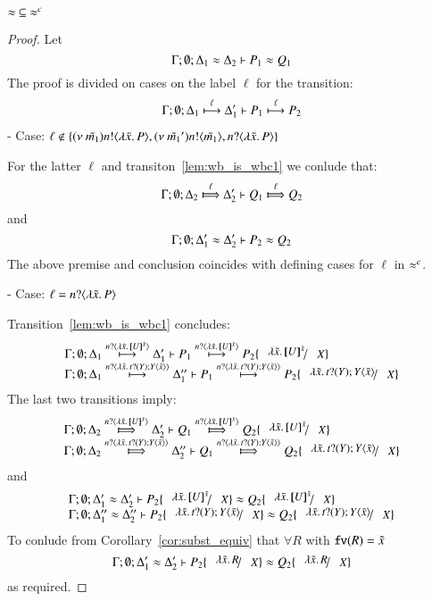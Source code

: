 
\begin{lemma}\rm
	\label{lem:wb_is_wbc}
	$\wb\ \subseteq\ \wbc$
\end{lemma}

\begin{proof}
	Let
	\[
		\horel{\Gamma}{\Delta_1}{P_1}{\wb}{\Delta_2}{Q_1}
	\]
	The proof is divided on cases on the label $\ell$ for the transition:
%
	\begin{eqnarray}
		\horel{\Gamma}{\Delta_1}{P_1}{\hby{\ell}}{\Delta_1'}{P_2}
		\label{lem:wb_is_wbc1}
	\end{eqnarray}
%
	\noi - Case: $\ell \notin \set{ \news{\tilde{m_1}} \bactout{n}{\abs{\tilde{x}}{P}},  \news{\tilde{m_1}'} \bactout{n}{\tilde{m_1}}, \bactinp{n}{\abs{\tilde{x}}{P}} }$

	\noi For the latter $\ell$ and transiton~\ref{lem:wb_is_wbc1} we conlude that:	
%
	\[
		\horel{\Gamma}{\Delta_2}{Q_1}{\Hby{\ell}}{\Delta_2'}{Q_2}
	\]
%
	\noi and
%
	\[
		\horel{\Gamma}{\Delta_1'}{P_2}{\wb}{\Delta_2'}{Q_2}
	\]
%
	The above premise and conclusion coincides with defining cases for $\ell$ in $\wbc$.

	\noi - Case: $\ell = \bactinp{n}{\abs{\tilde{x}}{P}}$

	\noi Transition~\ref{lem:wb_is_wbc1} concludes:
%
\[
	\begin{array}{l}
		\horel{\Gamma}{\Delta_1}{P_1}{\hby{\bactinp{n}{\abs{\tilde{x}}{\map{U}^{\tilde{x}}}}}}{\Delta_1'}{P_2 \subst{\abs{\tilde{x}}{\map{U}^{\tilde{x}}}}{X}}\\
		\horel{\Gamma}{\Delta_1}{P_1}{\hby{\bactinp{n}{\abs{\tilde{x}}{\binp{t}{Y} \appl{Y}{\tilde{x}}}}}}{\Delta_1''}{P_2 \subst{\abs{\tilde{x}}{\binp{t}{Y} \appl{Y}{\tilde{x}}}}{X}}
	\end{array}
\]
%
	\noi The last two transitions imply:
%
\[
	\begin{array}{l}
		\horel{\Gamma}{\Delta_2}{Q_1}{\Hby{\bactinp{n}{\abs{\tilde{x}}{\map{U}^{\tilde{x}}}}}}{\Delta_2'}{Q_2 \subst{\abs{\tilde{x}}{\map{U}^{\tilde{x}}}}{X}}\\
		\horel{\Gamma}{\Delta_2}{Q_1}{\Hby{\bactinp{n}{\abs{\tilde{x}}{\binp{t}{Y} \appl{Y}{\tilde{x}}}}}}{\Delta_2''}{Q_2 \subst{\abs{\tilde{x}}{\binp{t}{Y} \appl{Y}{\tilde{x}}}}{X}}
	\end{array}
\]
%
	\noi and
%
\[
	\begin{array}{l}
		\horel{\Gamma}{\Delta_1'}{P_2 \subst{\abs{\tilde{x}}{\map{U}^{\tilde{x}}}}{X}}{\wb}{\Delta_2'}{Q_2 \subst{\abs{\tilde{x}}{\map{U}^{\tilde{x}}}}{X}}\\
		\horel{\Gamma}{\Delta_1''}{P_2 \subst{\abs{\tilde{x}}{\binp{t}{Y} \appl{Y}{\tilde{x}}}}{X}}{\wb}{\Delta_2''}{Q_2 \subst{\abs{\tilde{x}}{\binp{t}{Y} \appl{Y}{\tilde{x}}}}{X}}
	\end{array}
\]
%
	\noi To conlude from Corollary~\ref{cor:subst_equiv} that
	$\forall R$ with $\fv{R} = \tilde{x}$
%
\[
	\horel{\Gamma}{\Delta_1'}{P_2 \subst{\abs{\tilde{x}}{R}}{X}}{\wb}{\Delta_2'}{Q_2 \subst{\abs{\tilde{x}}{R}}{X}}
\]
%
	\noi as required.


\end{proof}
